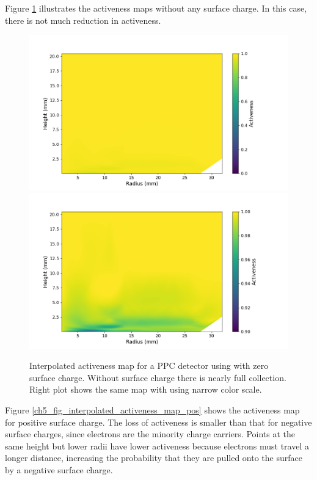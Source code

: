 Figure \ref{ch5_fig_interpolated_activeness_map_0} illustrates the activeness maps without any surface charge. In this case, there is not much reduction in activeness. 

\begin{figure}%
\centering
\includegraphics[trim={1.0cm 0cm 3.0cm 1cm},clip,width=0.49\linewidth]{ch5/figs/activeness_map_cubic_sc=0.0_ponama_1_5000_linear_full.png}
\includegraphics[trim={1.0cm 0cm 3.0cm 1cm},clip,width=0.49\linewidth]{ch5/figs/activeness_map_cubic_sc=0.0_ponama_1_5000_linear.png}
\caption{Interpolated activeness map for a PPC detector using \ehd with zero surface charge. Without surface charge there is nearly full collection. Right plot shows the same map with using narrow color scale.}
\label{ch5_fig_interpolated_activeness_map_0}
\end{figure}

Figure \ref{ch5_fig_interpolated_activeness_map_pos} shows the activeness map for positive surface charge. The loss of activeness is smaller than that for negative surface charges, since electrons are the minority charge carriers. Points at the same height but lower radii have lower activeness because electrons must travel a longer distance, increasing the probability that they are pulled onto the surface by a negative surface charge.

